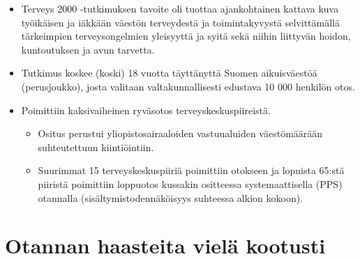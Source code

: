 \documentclass[
]{book}
\providecommand{\tightlist}{%
  \setlength{\itemsep}{0pt}\setlength{\parskip}{0pt}}
\begin{document}
\begin{itemize}
  \begin{itemize}
  \tightlist
  \item
    Terveys 2000 -tutkimuksen tavoite oli tuottaa ajankohtainen kattava kuva työikäisen ja iäkkään väestön terveydestä ja toimintakyvystä selvittämällä tärkeimpien terveysongelmien yleisyyttä ja syitä sekä niihin liittyvän hoidon, kuntoutuksen ja avun tarvetta.
  \item
    Tutkimus koskee (koski) 18 vuotta täyttänyttä Suomen aikuisväestöä (perusjoukko), josta valitaan valtakunnallisesti edustava 10 000 henkilön otos.
  \item
    Poimittiin kaksivaiheinen ryväsotos terveyskeskuspiireistä.

    \begin{itemize}
    \tightlist
    \item
      Ositus perustui yliopistosairaaloiden vastuualuiden väestömäärään suhteutettuun kiintiöintiin.
    \item
      Suurimmat 15 terveyskeskuspiiriä poimittiin otokseen ja lopuista 65:stä piiristä poimittiin loppuotos kussakin ositteessa systemaattisella (PPS) otannalla (sisältymistodennäköisyys suhteessa alkion kokoon).
    \end{itemize}
  \end{itemize}
\end{itemize}

\hypertarget{alaluku57}{%
\section{Otannan haasteita vielä kootusti}\label{alaluku57}}
\end{document}
